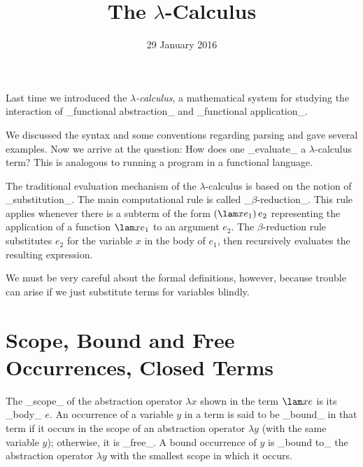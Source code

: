 \title{The $\lambda$-Calculus}
\date{29 January 2016}
\maketitle

Last time we introduced the \emph{$\lambda$-calculus},
a mathematical system for studying the interaction of
_functional abstraction_ and _functional application_.

We discussed the syntax and some conventions regarding parsing and gave several
examples. Now we arrive at the question: How does one _evaluate_ a $\lambda$-calculus term?
This is analogous to running a program in a functional language.

The traditional evaluation mechanism of the $\lambda$-calculus is based on the notion
of _substitution_. The main computational rule is called _$\beta$-reduction_. This rule applies
whenever there is a subterm of the form $(\lam x{e_1})\,e_2$ representing the
application of a function $\lam x{e_1}$ to an argument $e_2$. The $\beta$-reduction
rule substitutes $e_2$ for the variable $x$ in the body of $e_1$, then recursively
evaluates the resulting expression.

We must be very careful about the formal definitions, however,
because trouble can arise if we just substitute terms for variables blindly.

\section{Scope, Bound and Free Occurrences, Closed Terms}

The _scope_ of the abstraction operator $\lambda x$ shown in the term $\lam xe$ is its _body_ $e$. An occurrence of a variable $y$ in a term is said to be _bound_ in that term if it occurs in the scope of an abstraction operator $\lambda y$ (with the same variable $y$); otherwise, it is _free_. A bound occurrence of $y$ is _bound to_ the abstraction operator $\lambda y$ with the smallest scope in which it occurs.

